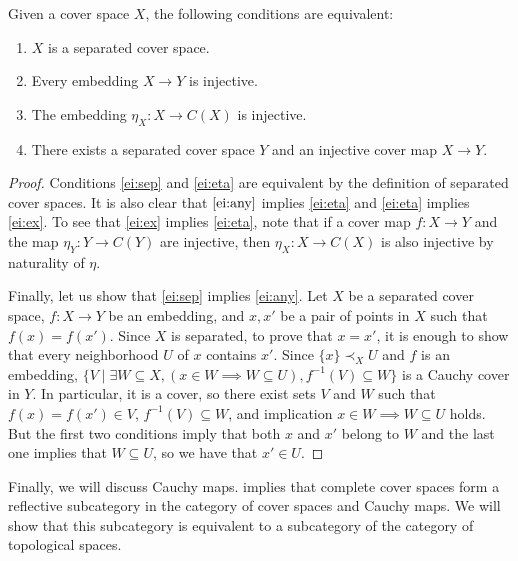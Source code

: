 \documentclass[reqno]{amsart}
\theoremstyle{definition}
\theoremstyle{remark}
\numberwithin{figure}{section}
\newcommand{\rb}{\prec}
\begin{document}
\begin{prop}
Given a cover space $X$, the following conditions are equivalent:
\begin{enumerate}
\item \label{ei:sep} $X$ is a separated cover space.
\item \label{ei:any} Every embedding $X \to Y$ is injective.
\item \label{ei:eta} The embedding $\eta_X : X \to C(X)$ is injective.
\item \label{ei:ex} There exists a separated cover space $Y$ and an injective cover map $X \to Y$.
\end{enumerate}
\end{prop}
\begin{proof}
Conditions \eqref{ei:sep} and \eqref{ei:eta} are equivalent by the definition of separated cover spaces.
It is also clear that $\eqref{ei:any}$ implies \eqref{ei:eta} and \eqref{ei:eta} implies \eqref{ei:ex}.
To see that \eqref{ei:ex} implies \eqref{ei:eta}, note that if a cover map $f : X \to Y$ and the map $\eta_Y : Y \to C(Y)$ are injective,
then $\eta_X : X \to C(X)$ is also injective by naturality of $\eta$.

Finally, let us show that \eqref{ei:sep} implies \eqref{ei:any}.
Let $X$ be a separated cover space, $f : X \to Y$ be an embedding, and $x,x'$ be a pair of points in $X$ such that $f(x) = f(x')$.
Since $X$ is separated, to prove that $x = x'$, it is enough to show that every neighborhood $U$ of $x$ contains $x'$.
Since $\{ x \} \rb_X U$ and $f$ is an embedding, $\{ V \mid \exists W \subseteq X, (x \in W \implies W \subseteq U), f^{-1}(V) \subseteq W \}$ is a Cauchy cover in $Y$.
In particular, it is a cover, so there exist sets $V$ and $W$ such that $f(x) = f(x') \in V$, $f^{-1}(V) \subseteq W$, and implication $x \in W \implies W \subseteq U$ holds.
But the first two conditions imply that both $x$ and $x'$ belong to $W$ and the last one implies that $W \subseteq U$, so we have that $x' \in U$.
\end{proof}

Finally, we will discuss Cauchy maps.
 implies that complete cover spaces form a reflective subcategory in the category of cover spaces and Cauchy maps.
We will show that this subcategory is equivalent to a subcategory of the category of topological spaces.
\end{document}
